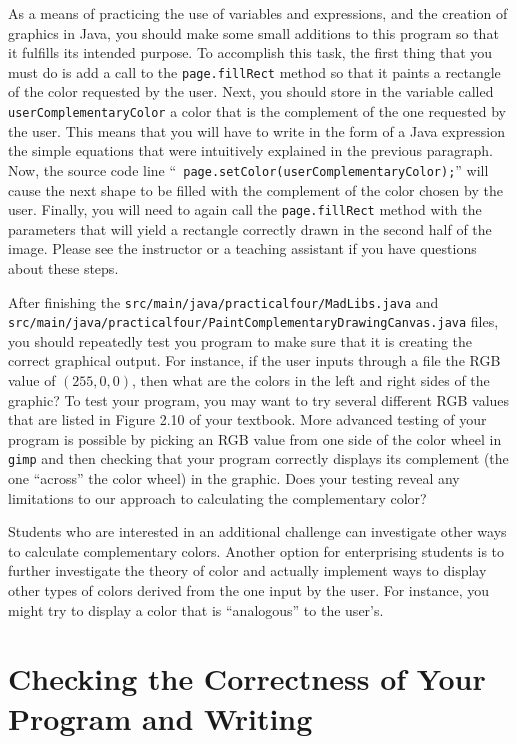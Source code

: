 \documentclass[11pt]{article}
\newcommand{\mainprogramsource}{\lstinline{src/main/java/practicalfour/MadLibs.java}}
\newcommand{\secondprogramsource}{\lstinline{src/main/java/practicalfour/PaintComplementaryDrawingCanvas.java}}
\begin{document}
As a means of practicing the use of variables and expressions, and the creation of graphics in Java, you should make
some small additions to this program so that it fulfills its intended purpose. To accomplish this task, the first thing
that you must do is add a call to the {\tt page.fillRect} method so that it paints a rectangle of the color requested by
the user. Next, you should store in the variable called {\tt userComplementaryColor} a color that is the complement of
the one requested by the user. This means that you will have to write in the form of a Java expression the simple
equations that were intuitively explained in the previous paragraph. Now, the source code line ``{\tt
page.setColor(userComplementaryColor);}'' will cause the next shape to be filled with the complement of the color chosen
by the user. Finally, you will need to again call the {\tt page.fillRect} method with the parameters that will yield a
rectangle correctly drawn in the second half of the image. Please see the instructor or a teaching assistant if you have
questions about these steps.

After finishing the \mainprogramsource{} and \secondprogramsource{} files, you should repeatedly test you program to
make sure that it is creating the correct graphical output. For instance, if the user inputs through a file the RGB
value of $(255, 0, 0)$, then what are the colors in the left and right sides of the graphic? To test your program, you
may want to try several different RGB values that are listed in Figure 2.10 of your textbook. More advanced testing of
your program is possible by picking an RGB value from one side of the color wheel in {\tt gimp} and then checking that
your program correctly displays its complement (the one ``across'' the color wheel) in the graphic. Does your testing
reveal any limitations to our approach to calculating the complementary color?

Students who are interested in an additional challenge can investigate other ways to calculate complementary colors.
Another option for enterprising students is to further investigate the theory of color and actually implement ways to
display other types of colors derived from the one input by the user. For instance, you might try to display a color
that is ``analogous'' to the user's.

\section*{Checking the Correctness of Your Program and Writing}
\end{document}
